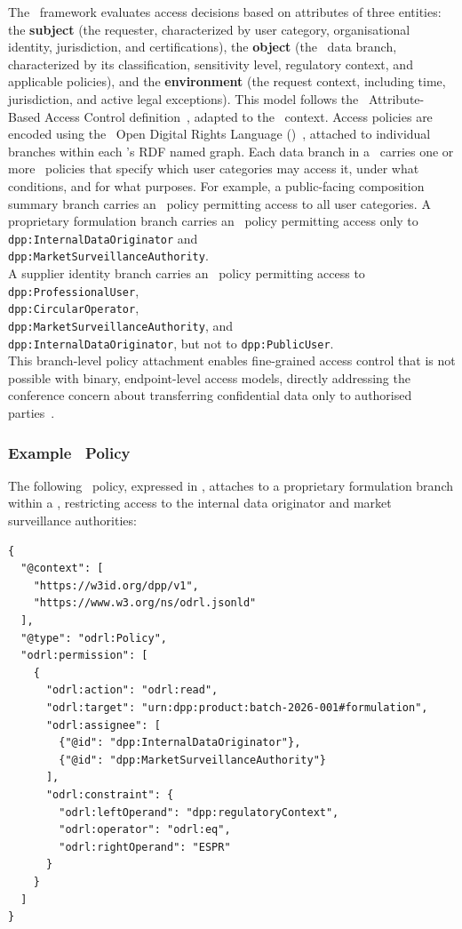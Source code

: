 The \ABAC\ framework evaluates access decisions based on attributes of three
entities: the \textbf{subject} (the requester, characterized by user category,
organisational identity, jurisdiction, and certifications), the \textbf{object}
(the \DPP\ data branch, characterized by its classification, sensitivity level,
regulatory context, and applicable policies), and the \textbf{environment} (the
request context, including time, jurisdiction, and active legal exceptions).
This model follows the \NIST\ Attribute-Based Access Control
definition~\cite{abac_nist}, adapted to the \DPP\ context. Access policies are
encoded using the \WthreeC\ Open Digital Rights Language
(\ODRL)~\cite{odrl_spec}, attached to individual branches within each \DPP's RDF
named graph. Each data branch in a \DPP\ carries one or more \ODRL\ policies
that specify which user categories may access it, under what conditions, and for
what purposes. For example, a public-facing composition summary branch carries
an \ODRL\ policy permitting access to all user categories. A proprietary
formulation branch carries an \ODRL\ policy permitting access only to \\
\texttt{dpp:InternalDataOriginator} and \\
\texttt{dpp:MarketSurveillanceAuthority}. \\A supplier identity branch carries
an \ODRL\ policy permitting access to \\ \texttt{dpp:ProfessionalUser}, \\
\texttt{dpp:CircularOperator}, \\ \texttt{dpp:MarketSurveillanceAuthority}, and
\\ \texttt{dpp:InternalDataOriginator}, but not to \texttt{dpp:PublicUser}. \\
This branch-level policy attachment enables fine-grained access control that is
not possible with binary, endpoint-level access models, directly addressing the
conference concern about transferring confidential data only to authorised
parties~\cite{dpp4eu2026_day1}.

\subsubsection{Example \ODRL\ Policy}

The following \ODRL\ policy, expressed in \JSONLD, attaches to a proprietary
formulation branch within a \DPP, restricting access to the internal data
originator and market surveillance authorities:

\begin{lstlisting}[language=jsonld]
{
  "@context": [
    "https://w3id.org/dpp/v1",
    "https://www.w3.org/ns/odrl.jsonld"
  ],
  "@type": "odrl:Policy",
  "odrl:permission": [
    {
      "odrl:action": "odrl:read",
      "odrl:target": "urn:dpp:product:batch-2026-001#formulation",
      "odrl:assignee": [
        {"@id": "dpp:InternalDataOriginator"},
        {"@id": "dpp:MarketSurveillanceAuthority"}
      ],
      "odrl:constraint": {
        "odrl:leftOperand": "dpp:regulatoryContext",
        "odrl:operator": "odrl:eq",
        "odrl:rightOperand": "ESPR"
      }
    }
  ]
}
\end{lstlisting}

